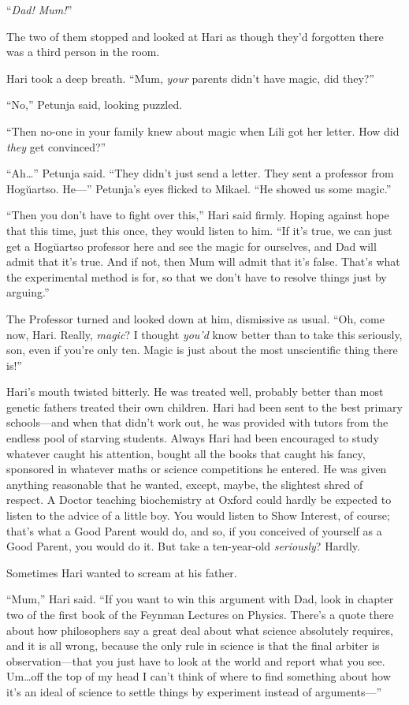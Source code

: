 “\emph{Dad! Mum!}”

The two of them stopped and looked at Hari as though they’d forgotten there was a third person in the room.

Hari took a deep breath. “Mum, \emph{your} parents didn’t have magic, did they?”

“No,” Petunja said, looking puzzled.

“Then no-one in your family knew about magic when Lili got her letter. How did \emph{they} get convinced?”

“Ah…” Petunja said. “They didn’t just send a letter. They sent a professor from Hogŭartso. He—” Petunja’s eyes flicked to Mikael. “He showed us some magic.”

“Then you don’t have to fight over this,” Hari said firmly. Hoping against hope that this time, just this once, they would listen to him. “If it’s true, we can just get a Hogŭartso professor here and see the magic for ourselves, and Dad will admit that it’s true. And if not, then Mum will admit that it’s false. That’s what the experimental method is for, so that we don’t have to resolve things just by arguing.”

The Professor turned and looked down at him, dismissive as usual. “Oh, come now, Hari. Really, \emph{magic}? I thought \emph{you’d} know better than to take this seriously, son, even if you’re only ten. Magic is just about the most unscientific thing there is!”

Hari’s mouth twisted bitterly. He was treated well, probably better than most genetic fathers treated their own children. Hari had been sent to the best primary schools—and when that didn’t work out, he was provided with tutors from the endless pool of starving students. Always Hari had been encouraged to study whatever caught his attention, bought all the books that caught his fancy, sponsored in whatever maths or science competitions he entered. He was given anything reasonable that he wanted, except, maybe, the slightest shred of respect. A Doctor teaching biochemistry at Oxford could hardly be expected to listen to the advice of a little boy. You would listen to Show Interest, of course; that’s what a Good Parent would do, and so, if you conceived of yourself as a Good Parent, you would do it. But take a ten-year-old \emph{seriously}? Hardly.

Sometimes Hari wanted to scream at his father.

“Mum,” Hari said. “If you want to win this argument with Dad, look in chapter two of the first book of the Feynman Lectures on Physics. There’s a quote there about how philosophers say a great deal about what science absolutely requires, and it is all wrong, because the only rule in science is that the final arbiter is observation—that you just have to look at the world and report what you see. Um…off the top of my head I can’t think of where to find something about how it’s an ideal of science to settle things by experiment instead of arguments—”

